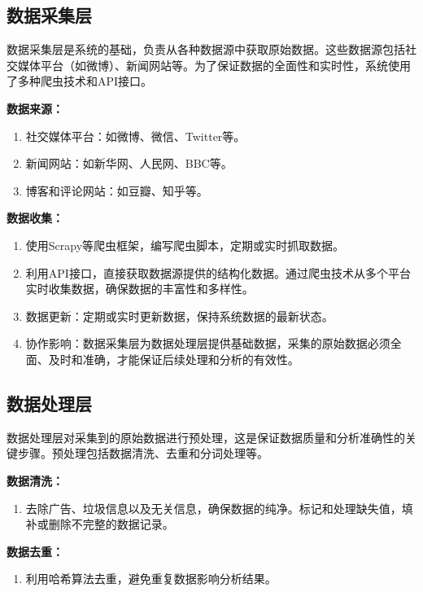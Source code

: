 \documentclass[UTF8,a4paper,15pt,titlepage,oneside]{ctexbook}
\begin{document}
\subsection{数据采集层}

数据采集层是系统的基础，负责从各种数据源中获取原始数据。这些数据源包括社交媒体平台（如微博）、新闻网站等。为了保证数据的全面性和实时性，系统使用了多种爬虫技术和API接口。


\vskip 0.2cm
\noindent
\textbf{数据来源：}

\begin{enumerate}[\textbullet]
  \item 社交媒体平台：如微博、微信、Twitter等。
  \item 新闻网站：如新华网、人民网、BBC等。
  \item 博客和评论网站：如豆瓣、知乎等。
\end{enumerate}

\vskip 0.2cm
\noindent
\textbf{数据收集：}

\begin{enumerate}[\textbullet]
  \item 使用Scrapy等爬虫框架，编写爬虫脚本，定期或实时抓取数据。
  \item 利用API接口，直接获取数据源提供的结构化数据。通过爬虫技术从多个平台实时收集数据，确保数据的丰富性和多样性。
  \item 数据更新：定期或实时更新数据，保持系统数据的最新状态。
  \item 协作影响：数据采集层为数据处理层提供基础数据，采集的原始数据必须全面、及时和准确，才能保证后续处理和分析的有效性。
\end{enumerate}

\subsection{数据处理层}

数据处理层对采集到的原始数据进行预处理，这是保证数据质量和分析准确性的关键步骤。预处理包括数据清洗、去重和分词处理等。

\vskip 0.2cm
\noindent
\textbf{数据清洗：}

\begin{enumerate}[\textbullet]
  \item 去除广告、垃圾信息以及无关信息，确保数据的纯净。标记和处理缺失值，填补或删除不完整的数据记录。
\end{enumerate}

\vskip 0.2cm
\noindent
\textbf{数据去重：}

\begin{enumerate}[\textbullet]
  \item 利用哈希算法去重，避免重复数据影响分析结果。
\end{enumerate}
\end{document}
